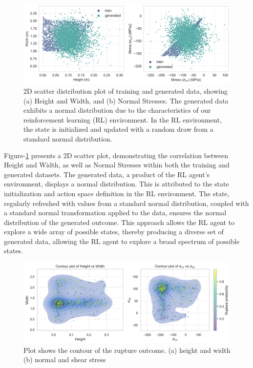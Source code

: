\documentclass{article}
\begin{document}
\begin{figure}[ht]
    \begin{center}
        \includegraphics[scale=0.45]{figures/height_width_stress_scatter.png}
    \end{center}
    \caption{2D scatter distribution plot of training and generated data, showing (a) Height and Width, and (b) Normal Stresses. The generated data exhibits a normal distribution due to the characteristics of our reinforcement learning (RL) environment. In the RL environment, the state is initialized and updated with a random draw from a standard normal distribution.}
    \label{fig:height_width_stress_scatter}
\end{figure}

Figure-\ref{fig:height_width_stress_scatter} presents a 2D scatter plot, demonstrating the correlation between Height and Width, as well as Normal Stresses within both the training and generated datasets. The generated data, a product of the RL agent's environment, displays a normal distribution. This is attributed to the state initialization and action space definition in the RL environment. The state, regularly refreshed with values from a standard normal distribution, coupled with a standard normal transformation applied to the data, ensures the normal distribution of the generated outcome. This approach allows the RL agent to explore a wide array of possible states, thereby producing a diverse set of generated data, allowing the RL agent to explore a broad spectrum of possible states.

\begin{figure}[!h]
    \begin{center}
        \includegraphics[scale=0.50]{figures/contour.png}
    \end{center}
    \caption{Plot shows the contour of the rupture outcome. (a) height and width (b) normal and shear stress}
    \label{fig:contour}
\end{figure}
\end{document}
